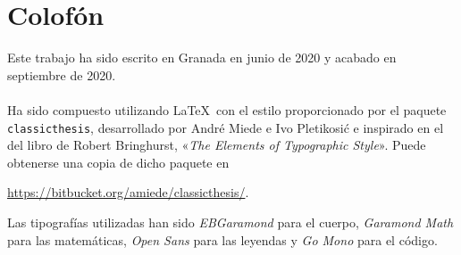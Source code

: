 \pagestyle{empty}

\hfill

\vfill


\section*{Colofón}
Este trabajo ha sido escrito en Granada en junio de 2020 y acabado en septiembre de 2020.\\\\
Ha sido compuesto utilizando \LaTeX\ con el estilo proporcionado por el paquete \texttt{classicthesis}, desarrollado por André Miede e Ivo Pletikosić e inspirado en el del libro de Robert Bringhurst, «\emph{The Elements of Typographic Style}».
Puede obtenerse una copia de dicho paquete en
\begin{center}
\url{https://bitbucket.org/amiede/classicthesis/}.
\end{center}
Las tipografías utilizadas han sido \emph{EBGaramond} para el cuerpo, \emph{Garamond Math} para las matemáticas, \emph{Open Sans} para las leyendas y \emph{Go Mono} para el código.
\bigskip